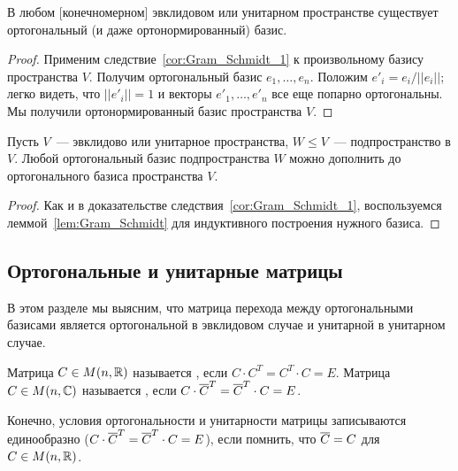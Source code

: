 \begin{corollary}\label{cor:orthogonal_basis_exists}
В любом [конечномерном] эвклидовом или унитарном пространстве
существует ортогональный (и даже ортонормированный) базис.
\end{corollary}
\begin{proof}
Применим следствие~\ref{cor:Gram_Schmidt_1} к произвольному базису
пространства $V$. Получим ортогональный базис $e_1,\dots,e_n$. Положим
$e'_i = e_i/||e_i||$; легко видеть, что $||e'_i|| = 1$ и векторы
$e'_1,\dots,e'_n$ все еще попарно ортогональны. Мы получили
ортонормированный базис пространства $V$.
\end{proof}

\begin{corollary}\label{cor:orthogonal_basis_extension}
Пусть $V$~--- эвклидово или унитарное пространства, $W\leq V$~---
подпространство в $V$. Любой ортогональный базис подпространства $W$
можно дополнить до ортогонального базиса пространства $V$.
\end{corollary}
\begin{proof}
Как и в доказательстве следствия~\ref{cor:Gram_Schmidt_1},
воспользуемся леммой~\ref{lem:Gram_Schmidt} для индуктивного
построения нужного базиса.
\end{proof}

\subsection{Ортогональные и унитарные матрицы}


В этом разделе мы выясним, что матрица перехода между ортогональными
базисами является ортогональной в эвклидовом случае и унитарной в
унитарном случае.

\begin{definition}
Матрица $C\in M(n,\mathbb R)$ называется
, если $C\cdot C^T =
C^T\cdot C = E$. Матрица $C\in M(n,\mathbb C)$ называется
, если $C\cdot \overline{C}^T =
\overline{C}^T\cdot C = E$.
\end{definition}

\begin{remark}
Конечно, условия ортогональности и унитарности матрицы записываются
единообразно ($C\cdot\overline{C}^T=\overline{C}^T\cdot C=E$), если помнить, что
$\overline{C}=C$ для $C\in M(n,\mathbb R)$.
\end{remark}

